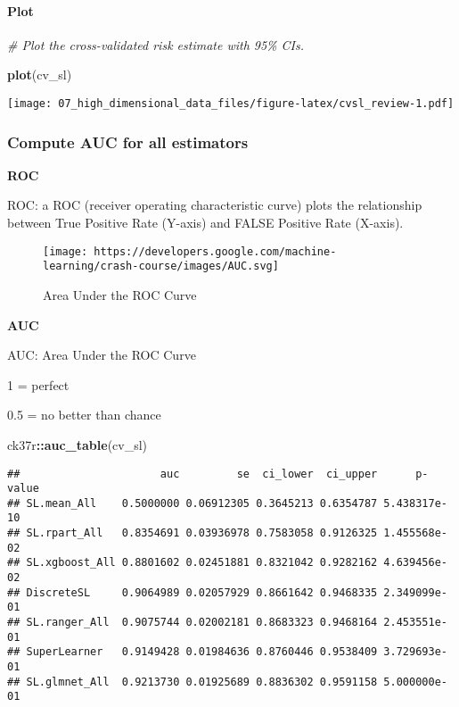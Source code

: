 \documentclass[
]{book}
\newenvironment{Shaded}{\begin{snugshade}}{\end{snugshade}}
\newcommand{\CommentTok}[1]{\textcolor[rgb]{0.56,0.35,0.01}{\textit{#1}}}
\newcommand{\KeywordTok}[1]{\textcolor[rgb]{0.13,0.29,0.53}{\textbf{#1}}}
\newcommand{\NormalTok}[1]{#1}
\newcommand{\OperatorTok}[1]{\textcolor[rgb]{0.81,0.36,0.00}{\textbf{#1}}}
\begin{document}
\hypertarget{plot}{%
\paragraph{Plot}\label{plot}}

\begin{Shaded}
\begin{Highlighting}[]
\CommentTok{\# Plot the cross{-}validated risk estimate with 95\% CIs.}

\KeywordTok{plot}\NormalTok{(cv\_sl)}
\end{Highlighting}
\end{Shaded}

\texttt{[image: 07\_high\_dimensional\_data\_files/figure-latex/cvsl\_review-1.pdf]}

\hypertarget{compute-auc-for-all-estimators}{%
\subsubsection{Compute AUC for all estimators}\label{compute-auc-for-all-estimators}}

\textbf{ROC}

ROC: a ROC (receiver operating characteristic curve) plots the relationship between True Positive Rate (Y-axis) and FALSE Positive Rate (X-axis).

\begin{figure}
\centering
\texttt{[image: https://developers.google.com/machine-learning/crash-course/images/AUC.svg]}
\caption{Area Under the ROC Curve}
\end{figure}

\textbf{AUC}

AUC: Area Under the ROC Curve

1 = perfect

0.5 = no better than chance

\begin{Shaded}
\begin{Highlighting}[]
\NormalTok{ck37r}\OperatorTok{::}\KeywordTok{auc\_table}\NormalTok{(cv\_sl)}
\end{Highlighting}
\end{Shaded}

\begin{verbatim}
##                      auc         se  ci_lower  ci_upper      p-value
## SL.mean_All    0.5000000 0.06912305 0.3645213 0.6354787 5.438317e-10
## SL.rpart_All   0.8354691 0.03936978 0.7583058 0.9126325 1.455568e-02
## SL.xgboost_All 0.8801602 0.02451881 0.8321042 0.9282162 4.639456e-02
## DiscreteSL     0.9064989 0.02057929 0.8661642 0.9468335 2.349099e-01
## SL.ranger_All  0.9075744 0.02002181 0.8683323 0.9468164 2.453551e-01
## SuperLearner   0.9149428 0.01984636 0.8760446 0.9538409 3.729693e-01
## SL.glmnet_All  0.9213730 0.01925689 0.8836302 0.9591158 5.000000e-01
\end{verbatim}
\end{document}
